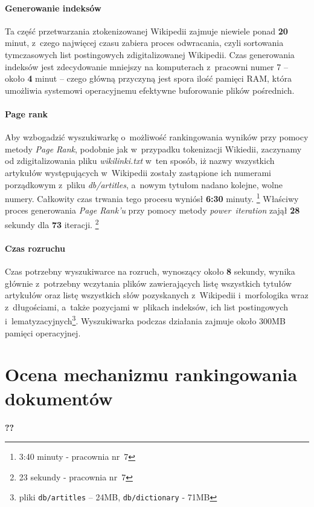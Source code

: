 \documentclass[a4paper,12pt]{article}
\begin{document}
\paragraph{Generowanie indeksów}
Ta część przetwarzania ztokenizowanej Wikipedii zajmuje niewiele ponad \textbf{20}
minut, z~czego najwięcej czasu zabiera proces odwracania, czyli
sortowania tymczasowych list postingowych zdigitalizowanej Wikipedii. Czas
generowania indeksów jest zdecydowanie mniejszy na komputerach z~pracowni numer
7 -- około \textbf{4} minut -- czego główną przyczyną jest spora ilość pamięci RAM,
która umożliwia systemowi operacyjnemu efektywne buforowanie plików pośrednich.

\paragraph{Page rank}
Aby wzbogadzić wyszukiwarkę o~możliwość rankingowania wyników przy pomocy metody
\textit{Page Rank}, podobnie jak w~przypadku tokenizacji Wikiedii, zaczynamy od
zdigitalizowania pliku \textit{wikilinki.txt} w~ten sposób, iż nazwy wszystkich artykułów
występujących w~Wikipedii zostały zastąpione ich numerami porządkowym z~pliku
\textit{db/artitles}, a~nowym tytułom nadano kolejne, wolne numery. Całkowity czas
trwania tego procesu wyniósł \textbf{6:30} minuty.
\footnote{3:40 minuty - pracownia nr~7}
Właściwy proces generowania \textit{Page Rank'u} przy pomocy metody
\textit{power~iteration} zajął \textbf{28} sekundy dla \textbf{73} iteracji.
\footnote{23 sekundy - pracownia nr~7}

\paragraph{Czas rozruchu}
Czas potrzebny wyszukiwarce na rozruch, wynoszący około \textbf{8} sekundy, wynika
głównie z~potrzebny wczytania plików zawierających listę wszystkich tytułów
artykułów oraz listę wszystkich słów pozyskanych z~Wikipedii i~morfologika wraz
z~długościami, a~także pozycjami w~plikach indeksów, ich list postingowych
i~lematyzacyjnych\footnote{pliki \texttt{db/artitles} -- 24MB,
\texttt{db/dictionary} - 71MB}. Wyszukiwarka podczas działania zajmuje około
300MB pamięci operacyjnej.

\section{Ocena mechanizmu rankingowania dokumentów}
\textbf{??}
\end{document}
